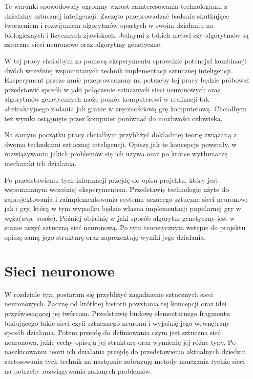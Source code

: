 \documentclass[12pt, oneside, a4paper]{report}
\begin{document}
Te warunki spowodowały ogromny wzrost zainteresowania technologiami z dziedziny sztucznej inteligencji. Zaczęto przeprowadzać badania skutkujące tworzeniem i rozwijaniem algorytmów opartych w swoim działaniu na biologicznych i fizycznych zjawiskach. Jednymi z takich metod czy algorytmów są sztuczne sieci neuronowe oraz algorytmy genetyczne.

W tej pracy chciałbym za pomocą eksperymentu sprawdzić potencjał kombinacji dwóch wcześniej wspomnianych technik implementacji sztucznej inteligencji. Eksperyment przeze mnie przeprowadzony na potrzeby tej pracy będzie próbował przedstawić sposób w jaki połączenie sztucznych sieci neuronowych oraz algorytmów genetycznych może pomóc komputerowi w realizacji tak abstrakcyjnego zadania jak granie w zręcznościową grę komputerową. Chciałbym też wyniki osiągnięte przez komputer porównać do możliwości człowieka.

Na samym początku pracy chciałbym przybliżyć dokładniej teorię związaną z dwoma technikami sztucznej inteligencji. Opiszę jak te koncepcje powstały, w rozwiązywaniu jakich problemów się ich używa oraz po krótce wytłumaczę mechaniki ich działania.

Po przedstawieniu tych informacji przejdę do opisu projektu, który jest wspomnianym wcześniej eksperymentem. Przedstawię technologie użyte do zaprojektowania i zaimplementowania systemu uczącego sztuczne sieci neuronowe jak i gry, którą w tym wypadku będzie własna implementacji popularnej gry w węża(\textit{ang. snake}). Później objaśnię w jaki sposób algorytm genetyczny jest w stanie uczyć sztuczną sieć neuronową. Po tym teoretycznym wstępie do projektu opiszę samą jego strukturę oraz zaprezentuję wyniki jego działania.


\chapter{Sieci neuronowe}

W rozdziale tym postaram się przybliżyć zagadnienie sztucznych sieci neuronowych. Zacznę od krótkiej historii powstania tej koncepcji oraz idei przyświecającej jej twórcom. Przedstawię budowę elementarnego fragmentu budującego takie sieci czyli sztucznego neuronu i wyjaśnię jego wewnętrzny sposób działania. Potem przejdę do definiowania czym jest sztuczna sieć neuronowa, jakie cechy opisują jej strukturę oraz wymienię jej różne typy. Po naszkicowaniu teorii ich działania przejdę do przedstawienia aktualnych dziedzin zastosowania tych technik na następnie zobrazuję metody nauczania tychże sieci na potrzeby rozwiązywania zadanych problemów.
\end{document}
